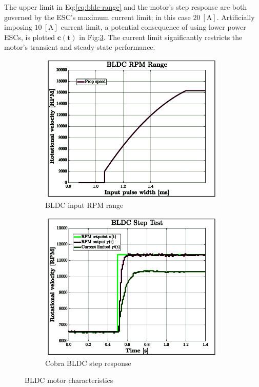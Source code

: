 The upper limit in Eq:\ref{eq:bldc-range} and the motor's step response are both governed by the ESC's maximum current limit; in this case $20~[\text{A}]$. Artificially imposing $10~[\text{A}]$ current limit, a potential consequence of using lower power ESCs, is plotted {\color{YellowGreen}$\mathbf{c(t)}$} in Fig:\ref{fig:bldc-step}. The current limit significantly restricts the motor's transient and steady-state performance. 
\begin{figure}[hbtp]
\begin{subfigure}{0.5\textwidth}
\centering
\includegraphics[width=0.98\textwidth]{graphs/bldc-range}
\caption{BLDC input RPM range}
\label{fig:bldc-range}
\end{subfigure}
\begin{subfigure}{0.5\textwidth}
\centering
\includegraphics[width=0.98\textwidth]{graphs/BLDC-step}
\caption{Cobra BLDC step response}
\label{fig:bldc-step}
\end{subfigure}
\caption{BLDC motor characteristics}
\end{figure}
